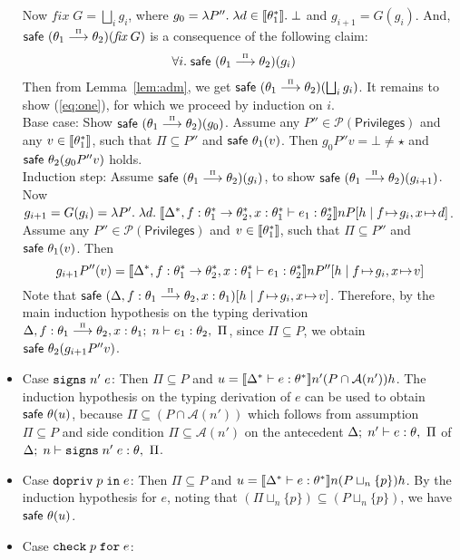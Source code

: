 \documentclass[submission,copyright,creativecommons]{eptcs}
\newcommand{\enable}[2]{\ENABLE\;#1\;\IN\;#2}
\newcommand{\chk}[2]{\CHK\;#1\;\FOR\;#2}
\newcommand{\signs}[2]{\SIGNS\;#1\;#2}
\newcommand{\FOR}{\mbox{\texttt{for}}}
\newcommand{\IN}{\mbox{\texttt{in}}}
\newcommand{\A}{\mathcal{A}}
\renewcommand{\P}{\mathcal{P}}
\newcommand{\ldb}{[\![}
\newcommand{\rdb}{]\!]}
\newcommand{\means}[1]{\ldb {#1}\rdb}
\newcommand{\intersect}{\cap}
\newcommand{\proves}{\vdash}
\newcommand{\recext}[5]{[#1\mid#2\!\mapsto\!#3,#4\!\mapsto\!#5]}
\newcommand{\lam}[2]{\lambda #1.\; #2} \newcommand{\all}[2]{\forall #1.\; #2}
\def\lpields#1{\stackrel{#1}{\longrightarrow}}
\newcommand{\annoto}[1]{\lpields {\scriptscriptstyle #1}}
\newcommand{\fix}{\textit{fix}}
\newcommand{\Lub}{\bigsqcup}
\newcommand{\PRIV}{{\mathsf{Privileges}}}
\newcommand{\ENABLE}{\mbox{\texttt{dopriv}}}
\newcommand{\CHK}{\mbox{\texttt{check}}}
\newcommand{\SIGNS}{\mbox{\texttt{signs}}}
\newcommand{\safe}{\textsf{safe}}
\newcommand{\n}{n} \newcommand{\p}{p} \newcommand{\Ps}{\Pi} \newcommand{\h}{h}
\newenvironment{xproof}{\begin{trivlist}\item[\hskip\labelsep{\bf  
Proof:}]}{\end{trivlist}}
\begin{document}
\begin{xproof}
\begin{itemize}
Now $\fix\;G=\Lub_{i}g_i$, where $g_0=\lam{P''}{\lam{d\in\means{\th_1^*}}{\bot}}$ and
$g_{i+1}=G(g_i)$. 
And, $\safe~(\th_1\annoto{\Ps}\th_2)(\fix\;G)$ is a consequence of the 
following claim:
\begin{eqnarray}
  \label{eq:one}
& \forall i.\; \safe~(\th_1\annoto{\Ps}\th_2)(g_i) 
\end{eqnarray}
Then from Lemma~\ref{lem:adm}, we get 
$\safe~(\th_1\annoto{\Ps}\th_2)(\Lub_{i}g_i)$. 
It remains to show (\ref{eq:one}), for which we proceed by induction on $i$.\\
Base case: Show $\safe~(\th_1\annoto{\Ps}\th_2)(g_0)$. Assume any 
$P''\in\P(\PRIV)$ and any $v\in\means{\th_1^*}$, such that 
$\Ps\subseteq P''$ and $\safe~ {\th_1}(v)$. Then $g_{0}P''v=\bot\neq\star$ 
and $\safe~ {\th_2}(g_{0}P''v)$ holds. \\
Induction step: Assume $\safe~(\th_1\annoto{\Ps}\th_2)(g_i)$, to show
$\safe~(\th_1\annoto{\Ps}\th_2)(g_{i+1})$. \\
Now $g_{i+1}=G(g_i)=
\lam{P'}{\lam{d}{\means{\Delta^*,f:\th_1^*\to\th_2^*,x:\th_1^*
\proves e_1:\th_2^*}\n P \recext{\h}{f}{g_i}{x}{d}}}$. Assume any
$P''\in\P(\PRIV)$ and $v\in\means{\th_1^*}$, such that $\Ps\subseteq P''$
and $\safe~ {\th_1}(v)$.  
Then 
\[
g_{i+1}P''(v)=\means{\Delta^*,f:\th_1^*\to\th_2^*,x:\th_1^*
\proves e_1:\th_2^*}\n P'' \recext{\h}{f}{g_i}{x}{v}
\]
Note that
$\safe~(\Delta,f:\th_1\annoto{\Ps}\th_2,x:\th_1)\recext{\h}{f}{g_i}{x}{v}$.
Therefore, by the main induction hypothesis on the typing derivation 
$\Delta, f:\th_1\annoto{\Ps}\th_2, x:\th_1;\;\n
      \proves e_1:\th_2, ~\Ps$, since $\Ps\subseteq P$, we obtain
$\safe~ {\th_2}(g_{i+1}P''v)$.
\item Case $\signs{\n'}{e}$:
Then $\Ps\subseteq P$ and 
$u=\means{\Delta^*\proves e:\th^*}\n'(P\intersect\A(\n')) \h$. 
The induction hypothesis on the typing derivation
of $e$ can be used to obtain $\safe~ {\th}(u)$, 
because $\Ps\subseteq(P\intersect\A(\n'))$ which follows from 
assumption $\Ps\subseteq P$ and side condition $\Ps\subseteq \A(\n')$
on the antecedent $\Delta;\;\n'\proves e:\th, ~\Ps$ of 
$\Delta;\;\n\proves \signs{\n'}{e}:\th,~\Ps$.
\item Case $\enable{\p}{e}$:
Then $\Ps\subseteq P$ and 
$u=\means{\Delta^*\proves e:\th^*}\n(P\sqcup_{\n}\{\p\}) \h$.
By the induction hypothesis for $e$, noting that 
$(\Ps\sqcup_{\n}\{\p\})\subseteq(P\sqcup_{\n}\{\p\})$, we have $\safe~ {\th}(u)$.
\item Case $\chk{p}{e}$: 
\begin{sloppypar}

\end{sloppypar}
\end{itemize}
\end{xproof}
\end{document}
